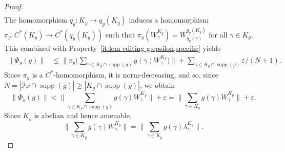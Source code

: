 \documentclass[a4paper, 12pt]{amsart}
\theoremstyle{plain}
\theoremstyle{definition}
\theoremstyle{remark}
\newcommand{\supp}{\operatorname{supp}}
\newcommand{\Iicl}{\overline{\mathcal{I}}}
\numberwithin{equation}{section}
\begin{document}
\begin{proof}
\begin{align*}
\end{align*}
The homomorphism $q_y \colon K_y \to q_{y}(K_y)$ induces a homomorphism $\pi_y \colon C^*(K_y) \to C^*(q_{y}(K_y))$ such that
$\pi_y(W^{K_y}_\gamma) = W^{q_y(K_y)}_{q_y(\gamma)}$ for all $\gamma \in K_y$. This combined with Property~\ref{it:lem editing g:epsilon,specific} yields
\begin{align*}
\|\Phi_y(g)\|
    &\le \Big\|\pi_y\Big(\sum_{\gamma \in K_y \cap \supp(g)} g(\gamma) W^{K_y}_{\gamma}\Big)\Big\| + \sum_{\gamma \in K_y \cap \supp(g)} \varepsilon/(N+1).
\end{align*}
Since $\pi_y$ is a $C^*$-homomorphism, it is norm-decreasing, and so, since $N = |\Iicl x \cap \supp(g)| \ge |K_y \cap \supp(g)|$, we obtain
\begin{equation}\label{eq:Phiyg estimate}
\|\Phi_y(g)\|
    < \Big\|\sum_{\gamma \in K_y \cap \supp(g)} g(\gamma) W^{K_y}_{\gamma}\Big\| + \varepsilon
    = \Big\|\sum_{\gamma \in K_y} g(\gamma) W^{K_y}_\gamma\Big\| + \varepsilon.
\end{equation}
Since $K_y$ is abelian and hence amenable,
\begin{equation}\label{eq:full->regular}
\Big\|\sum_{\gamma \in K_y} g(\gamma) W^{K_y}_\gamma\Big\|
    = \Big\|\sum_{\gamma \in K_y} g(\gamma) \lambda^{K_y}_\gamma\Big\|.
\end{equation}


\end{proof}
\end{document}
